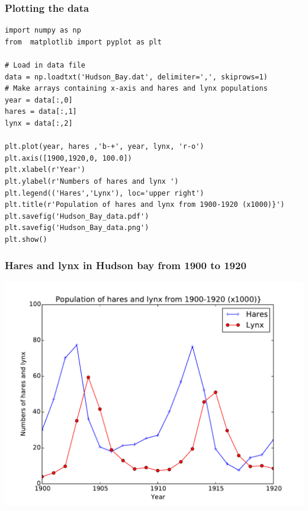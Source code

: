 \documentclass{beamer}
\begin{document}
\begin{frame}
\frametitle{Plotting the data}

\begin{block}{}
\begin{verbatim}
import numpy as np
from  matplotlib import pyplot as plt

# Load in data file
data = np.loadtxt('Hudson_Bay.dat', delimiter=',', skiprows=1)
# Make arrays containing x-axis and hares and lynx populations
year = data[:,0]
hares = data[:,1]
lynx = data[:,2]

plt.plot(year, hares ,'b-+', year, lynx, 'r-o')
plt.axis([1900,1920,0, 100.0])
plt.xlabel(r'Year')
plt.ylabel(r'Numbers of hares and lynx ')
plt.legend(('Hares','Lynx'), loc='upper right')
plt.title(r'Population of hares and lynx from 1900-1920 (x1000)}')
plt.savefig('Hudson_Bay_data.pdf')
plt.savefig('Hudson_Bay_data.png')
plt.show()
\end{verbatim}
\end{block}
\end{frame}

\begin{frame}
\frametitle{Hares and lynx in Hudson bay from 1900 to 1920}

\vspace{6mm}

\centerline{\includegraphics[width=0.9\linewidth]{fig/Hudson_Bay_data.pdf}}

\vspace{6mm}
\end{frame}
\end{document}
